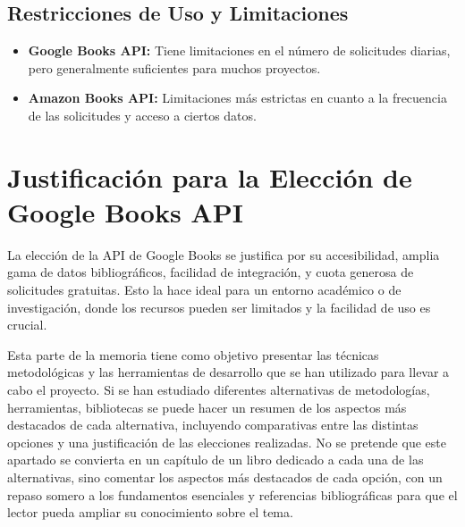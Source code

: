 \subsection{Restricciones de Uso y Limitaciones}
\begin{itemize}
    \item \textbf{Google Books API:} Tiene limitaciones en el número de solicitudes diarias, pero generalmente suficientes para muchos proyectos.
    \item \textbf{Amazon Books API:} Limitaciones más estrictas en cuanto a la frecuencia de las solicitudes y acceso a ciertos datos.
\end{itemize}

\section{Justificación para la Elección de Google Books API}
La elección de la API de Google Books se justifica por su accesibilidad, amplia gama de datos bibliográficos, facilidad de integración, y cuota generosa de solicitudes gratuitas. Esto la hace ideal para un entorno académico o de investigación, donde los recursos pueden ser limitados y la facilidad de uso es crucial.









Esta parte de la memoria tiene como objetivo presentar las técnicas metodológicas y las herramientas de desarrollo que se han utilizado para llevar a cabo el proyecto. Si se han estudiado diferentes alternativas de metodologías, herramientas, bibliotecas se puede hacer un resumen de los aspectos más destacados de cada alternativa, incluyendo comparativas entre las distintas opciones y una justificación de las elecciones realizadas. 
No se pretende que este apartado se convierta en un capítulo de un libro dedicado a cada una de las alternativas, sino comentar los aspectos más destacados de cada opción, con un repaso somero a los fundamentos esenciales y referencias bibliográficas para que el lector pueda ampliar su conocimiento sobre el tema.